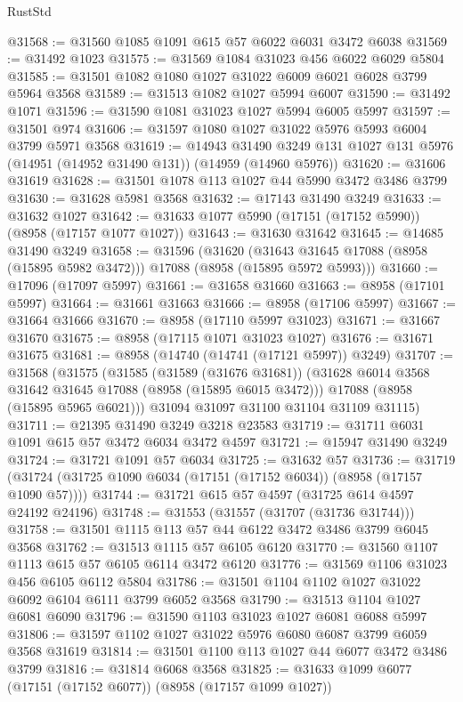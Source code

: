 \begin{lexlean}{RustStd}
\begin{coremodule}
@31568 := @31560 @1085 @1091 @615 @57 @6022 @6031 @3472 @6038
@31569 := @31492 @1023
@31575 := @31569 @1084 @31023 @456 @6022 @6029 @5804
@31585 := @31501 @1082 @1080 @1027 @31022 @6009 @6021 @6028 @3799 @5964 @3568
@31589 := @31513 @1082 @1027 @5994 @6007
@31590 := @31492 @1071
@31596 := @31590 @1081 @31023 @1027 @5994 @6005 @5997
@31597 := @31501 @974
@31606 := @31597 @1080 @1027 @31022 @5976 @5993 @6004 @3799 @5971 @3568
@31619 := @14943
    @31490
    @3249
    @131
    @1027
    @131
    @5976
    (@14951 (@14952 @31490 @131))
    (@14959 (@14960 @5976))
@31620 := @31606 @31619
@31628 := @31501 @1078 @113 @1027 @44 @5990 @3472 @3486 @3799
@31630 := @31628 @5981 @3568
@31632 := @17143 @31490 @3249
@31633 := @31632 @1027
@31642 := @31633 @1077 @5990 (@17151 (@17152 @5990)) (@8958 (@17157 @1077 @1027))
@31643 := @31630 @31642
@31645 := @14685 @31490 @3249
@31658 := @31596
    (@31620 (@31643 @31645 @17088 (@8958 (@15895 @5982 @3472))) @17088 (@8958 (@15895 @5972 @5993)))
@31660 := @17096 (@17097 @5997)
@31661 := @31658 @31660
@31663 := @8958 (@17101 @5997)
@31664 := @31661 @31663
@31666 := @8958 (@17106 @5997)
@31667 := @31664 @31666
@31670 := @8958 (@17110 @5997 @31023)
@31671 := @31667 @31670
@31675 := @8958 (@17115 @1071 @31023 @1027)
@31676 := @31671 @31675
@31681 := @8958 (@14740 (@14741 (@17121 @5997)) @3249)
@31707 := @31568
    (@31575
      (@31585
        (@31589 (@31676 @31681))
        (@31628 @6014 @3568 @31642 @31645 @17088 (@8958 (@15895 @6015 @3472)))
        @17088
        (@8958 (@15895 @5965 @6021)))
      @31094
      @31097
      @31100
      @31104
      @31109
      @31115)
@31711 := @21395 @31490 @3249 @3218 @23583
@31719 := @31711 @6031 @1091 @615 @57 @3472 @6034 @3472 @4597
@31721 := @15947 @31490 @3249
@31724 := @31721 @1091 @57 @6034
@31725 := @31632 @57
@31736 := @31719 (@31724 (@31725 @1090 @6034 (@17151 (@17152 @6034)) (@8958 (@17157 @1090 @57))))
@31744 := @31721 @615 @57 @4597 (@31725 @614 @4597 @24192 @24196)
@31748 := @31553 (@31557 (@31707 (@31736 @31744)))
@31758 := @31501 @1115 @113 @57 @44 @6122 @3472 @3486 @3799 @6045 @3568
@31762 := @31513 @1115 @57 @6105 @6120
@31770 := @31560 @1107 @1113 @615 @57 @6105 @6114 @3472 @6120
@31776 := @31569 @1106 @31023 @456 @6105 @6112 @5804
@31786 := @31501 @1104 @1102 @1027 @31022 @6092 @6104 @6111 @3799 @6052 @3568
@31790 := @31513 @1104 @1027 @6081 @6090
@31796 := @31590 @1103 @31023 @1027 @6081 @6088 @5997
@31806 := @31597 @1102 @1027 @31022 @5976 @6080 @6087 @3799 @6059 @3568 @31619
@31814 := @31501 @1100 @113 @1027 @44 @6077 @3472 @3486 @3799
@31816 := @31814 @6068 @3568
@31825 := @31633 @1099 @6077 (@17151 (@17152 @6077)) (@8958 (@17157 @1099 @1027))

\end{coremodule}
\end{lexlean}
